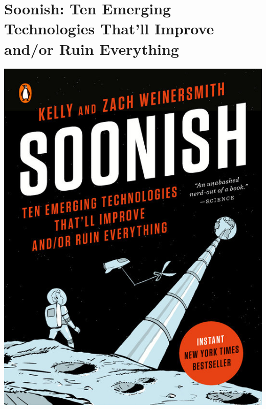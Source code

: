 \documentclass{tufte-handout}
\makeatletter
\newcommand{\varcaption}[2][0pt]{%
  \gsetlength{\@tufte@caption@vertical@offset}{-#1}%
  \gdef\@tufte@stored@varcaption{#2}%
}
\gdef\@tufte@stored@varcaption{} %
\makeatother
\begin{document}
\section*{Soonish: Ten Emerging Technologies That'll Improve and/or Ruin Everything}
\begin{marginfigure}[12\baselineskip]
   \includegraphics[width=\linewidth]{images/soonish.jpg}
   \varcaption{\href{https://www.penguinrandomhouse.com/books/536910/soonish-by-kelly-and-zach-weinersmith/}{Publisher Link}, \href{https://www.amazon.com/Soonish-Emerging-Technologies-Improve-Everything/dp/0399563849/}{Amazon Link}}
\end{marginfigure}
\end{document}
